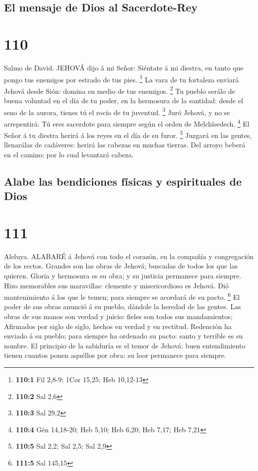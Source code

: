 \hypertarget{el-mensaje-de-dios-al-sacerdote-rey}{%
\subsection{El mensaje de Dios al
Sacerdote-Rey}\label{el-mensaje-de-dios-al-sacerdote-rey}}

\hypertarget{section-109}{%
\section{110}\label{section-109}}

 Salmo de David. JEHOVÁ dijo á mi Señor: Siéntate á mi
diestra, en tanto que pongo tus enemigos por estrado de tus pies.
\footnote{\textbf{110:1} Fil 2,8-9; 1Cor 15,25; Heb 10,12-13}
 La vara de tu fortaleza enviará Jehová desde Sión: domina
en medio de tus enemigos. \footnote{\textbf{110:2} Sal 2,6} 
Tu pueblo serálo de buena voluntad en el día de tu poder, en la
hermosura de la santidad: desde el seno de la aurora, tienes tú el rocío
de tu juventud. \footnote{\textbf{110:3} Sal 29,2}  Juró
Jehová, y no se arrepentirá: Tú eres sacerdote para siempre según el
orden de Melchîsedech. \footnote{\textbf{110:4} Gén 14,18-20; Heb 5,10;
  Heb 6,20; Heb 7,17; Heb 7,21}  El Señor á tu diestra
herirá á los reyes en el día de su furor. \footnote{\textbf{110:5} Sal
  2,2; Sal 2,5; Sal 2,9}  Juzgará en las gentes, llenarálas
de cadáveres: herirá las cabezas en muchas tierras.  Del
arroyo beberá en el camino: por lo cual levantará cabeza.

\hypertarget{alabe-las-bendiciones-fuxedsicas-y-espirituales-de-dios}{%
\subsection{Alabe las bendiciones físicas y espirituales de
Dios}\label{alabe-las-bendiciones-fuxedsicas-y-espirituales-de-dios}}

\hypertarget{section-110}{%
\section{111}\label{section-110}}

 Aleluya. ALABARÉ á Jehová con todo el corazón, en la
compañía y congregación de los rectos.  Grandes son las
obras de Jehová; buscadas de todos los que las quieren. 
Gloria y hermosura es su obra; y su justicia permanece para siempre.
 Hizo memorables sus maravillas: clemente y misericordioso
es Jehová.  Dió mantenimiento á los que le temen; para
siempre se acordará de su pacto. \footnote{\textbf{111:5} Sal 145,15}
 El poder de sus obras anunció á su pueblo, dándole la
heredad de las gentes.  Las obras de sus manos son verdad y
juicio: fieles son todos sus mandamientos;  Afirmados por
siglo de siglo, hechos en verdad y en rectitud.  Redención
ha enviado á su pueblo; para siempre ha ordenado su pacto: santo y
terrible es su nombre.  El principio de la sabiduría es el
temor de Jehová: buen entendimiento tienen cuantos ponen aquéllos por
obra: su loor permanece para siempre.

